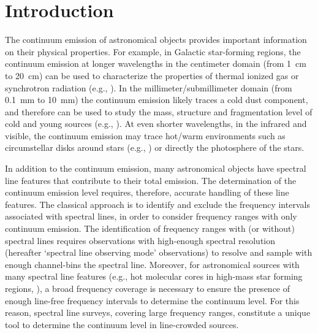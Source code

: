 \documentclass{aa}
\begin{document}

   \maketitle


%
\section{Introduction}\label{s:intro}

The continuum emission of astronomical objects provides important information on their physical properties. For example, in Galactic star-forming regions, the continuum emission at longer wavelengths in the centimeter domain (from 1~cm to 20~cm) can be used to characterize the properties of thermal ionized gas or synchrotron radiation (e.g., \citealt{WoodChurchwell1989, SanchezMonge2013a, SanchezMonge2013c, Beltran2016, Ramachandran2017}). In the millimeter/submillimeter domain (from 0.1~mm to 10~mm) the continuum emission likely traces a cold dust component, and therefore can be used to study the mass, structure and fragmentation level of cold and young sources (e.g., \citealt{Elia2010, Palau2014, Palau2017, Fontani2016, Schmiedeke2016, Koenig2017}). At even shorter wavelengths, in the infrared and visible, the continuum emission may trace hot/warm environments such as circumstellar disks around stars (e.g., \citealt{Aumann1984, Kraus2010, Kraus2017, Boley2016}) or directly the photosphere of the stars.

In addition to the continuum emission, many astronomical objects have spectral line features that contribute to their total emission. The determination of the continuum emission level requires, therefore, accurate handling of these line features. The classical approach is to identify and exclude the frequency intervals associated with spectral lines, in order to consider frequency ranges with only continuum emission. The identification of frequency ranges with (or without) spectral lines requires observations with high-enough spectral resolution (hereafter  `spectral line observing mode' observations) to resolve and sample with enough channel-bins the spectral line. Moreover, for astronomical sources with many spectral line features (e.g., hot molecular cores in high-mass star forming regions, \citealt{SanchezMonge2017, Allen2017}), a broad frequency coverage is necessary to ensure the presence of enough line-free frequency intervals to determine the continuum level. For this reason, spectral line surveys, covering large frequency ranges, constitute a unique tool to determine the continuum level in line-crowded sources.
\end{document}
